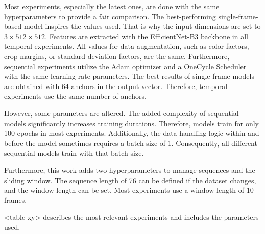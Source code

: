 Most experiments, especially the latest ones, are done with the same hyperparameters to provide a fair comparison.
The best-performing single-frame-based model inspires the values used.
That is why the input dimensions are set to $3 \times 512 \times 512$.
Features are extracted with the EfficientNet-B3 backbone in all temporal experiments.
All values for data augmentation, such as color factors, crop margins, or standard deviation factors, are the same.
Furthermore, sequential experiments utilize the Adam optimizer \cite{pytorchAdamOptimizer} and a OneCycle Scheduler \cite{pytorch_oneCycleLR_docu} with the same learning rate parameters.
The best results of single-frame models are obtained with 64 anchors in the output vector.
Therefore, temporal experiments use the same number of anchors.

However, some parameters are altered.
The added complexity of sequential models significantly increases training durations.
Therefore, models train for only 100 epochs in most experiments.
Additionally, the data-handling logic within and before the model sometimes requires a batch size of 1.
Consequently, all different sequential models train with that batch size.

Furthermore, this work adds two hyperparameters to manage sequences and the sliding window.
The sequence length of 76 can be defined if the dataset changes, and the window length can be set.
Most experiments use a window length of 10 frames.

<table xy> describes the most relevant experiments and includes the parameters used.

\vspace{1cm}

